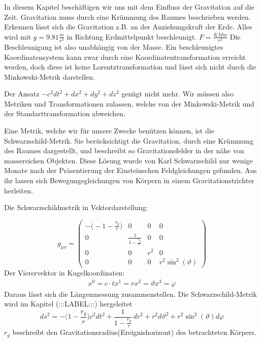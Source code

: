 \begin{refsection}
	In diesem Kapitel beschäftigen wir uns mit dem Einfluss der Gravitation auf die Zeit. Gravitation muss durch eine Krümmung des Raumes beschrieben werden. Erkennen lässt sich die Gravitation z.B. an der Anziehungskraft der Erde. Alles wird mit $g=9.81\frac{m}{s^2}$ in Richtung Erdmittelpunkt beschleunigt. $F=\frac{KMm}{r^2}$
	Die Beschleunigung ist also unabhängig von der Masse.
	Ein beschleunigtes Koordinatensystem kann zwar durch eine Koordinatentransformation erreicht werden, doch diese ist keine Lorentztransformation und lässt sich nicht durch die Minkowski-Metrik darstellen.
	
	Der Ansatz $ -c^2dt^2 + dx^2 + dy^2 + dz^2$ genügt nicht mehr. Wir müssen also Metriken und Transformationen zulassen, welche von der Minkowski-Metrik und der Standarttransformation abweichen.
	
	Eine Metrik, welche wir für unsere Zwecke benützen können, ist die Schwarzschild-Metrik. Sie berücksichtigt die Gravitation, durch eine Krümmung des Raumes dargestellt, und beschreibt so Gravitationsfelder in der nähe von massereichen Objekten. Diese Lösung wurde von Karl Schwarzschild nur wenige Monate nach der Präsentierung der Einsteinschen Feldgleichungen gefunden. Aus ihr lassen sich Bewegungsgleichungen von Körpern in einem Gravitationstrichter herleiten. 
	
	Die Schwarzschildmetrik in Vektordarstellung:

    \begin{equation}
		g_{\mu\nu}=
		\begin{pmatrix}
		-\biggl(-1-\frac{r_{g}}{r}\biggr) & 0 & 0 & 0 \\
		0 & \frac{1}{\displaystyle1-\frac{r_{g}}{r}} & 0 & 0 \\
		0 & 0 & r^{2} & 0 \\
		0 & 0 & 0 & r^{2}\sin^{2}(\vartheta)
		\end{pmatrix}
	\end{equation}
Der Vierervektor in Kugelkoordinaten:
	\begin{align*}
		x^{0}=c\cdot t
		x^{1}=r
		x^{2}=\vartheta
		x^{3}=\varphi
	\end{align*}
	Daraus lässt sich die Längenmessung zusammenstellen. Die Schwarzschild-Metrik wird im Kapitel (:::LABEL:::) hergeleitet
	\begin{equation}
	ds^2
	=
	-\biggl(1-\frac{r_g}r\biggr)c^2dt^2
	+
	\frac{1}{\displaystyle 1-\frac{r_g}r}\,dr^2 
	+
	r^2d\vartheta^2 
	+ 
	r^2\sin^2(\vartheta)d\varphi
	\end{equation}
	$r_g$ beschreibt den Gravitationsradius(Ereignishorizont) des betrachteten Körpers.

\end{refsection}
